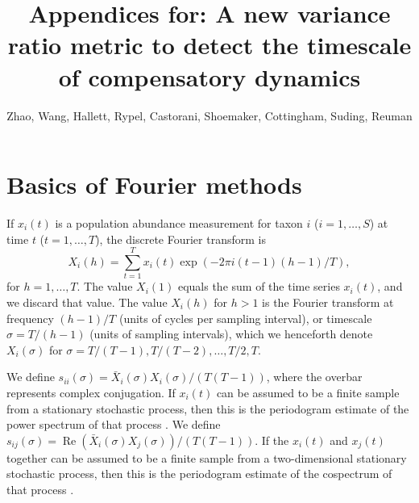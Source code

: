 \documentclass[letterpaper,11pt]{article}
\newcommand{\Rp}{{\operatorname{Re}}}
\begin{document}
\title{Appendices for: A new variance ratio metric to detect the timescale of compensatory dynamics}
\author{Zhao, Wang, Hallett, Rypel, Castorani, Shoemaker, Cottingham, Suding, Reuman}
\date{}
\maketitle

\section{Basics of Fourier methods}\label{sec:spec}
\noindent If $x_i(t)$ is a population abundance measurement for taxon $i$ 
($i=1,\ldots,S$) at time $t$ ($t=1,\ldots,T$), the discrete Fourier transform is 
\begin{equation}
X_i(h)=\sum_{t=1}^T x_i(t) \exp(-2 \pi i (t-1)(h-1)/T),
\end{equation}
for $h=1,\ldots,T$. The value $X_i(1)$ equals the sum of the time series $x_i(t)$,
and we discard that value. The value $X_i(h)$ for $h>1$ is the Fourier transform 
at frequency $(h-1)/T$ (units of cycles per sampling interval), or timescale 
$\sigma=T/(h-1)$ (units of sampling intervals), which we henceforth
denote $X_i(\sigma)$ for $\sigma=T/(T-1),T/(T-2),\ldots,T/2,T$.

We define $s_{ii}(\sigma)=\bar{X}_i(\sigma) X_i(\sigma)/(T(T-1))$, where the overbar
represents complex conjugation. If $x_i(t)$
can be assumed to be a finite sample from a stationary stochastic 
process, then this is the periodogram estimate of the power spectrum of that
process \citep{Brillinger2001}. We define 
$s_{ij}(\sigma)=\Rp(\bar{X}_i(\sigma) X_j(\sigma))/(T(T-1))$. If the $x_i(t)$
and $x_j(t)$ together can be assumed to be a finite sample from a two-dimensional
stationary stochastic process, then this is the periodogram estimate of the 
cospectrum of that process \citep{Brillinger2001}. 
\end{document}
